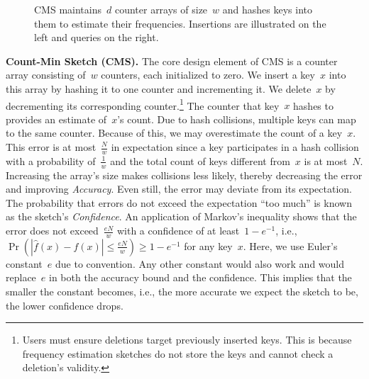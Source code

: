 \documentclass[sigconf]{acmart}
\begin{document}
\begin{figure}
\begin{tikzpicture}
    \end{tikzpicture}
    \caption{CMS maintains~$d$ counter arrays of size~$w$ and hashes keys into
    them to estimate their frequencies. Insertions are illustrated on the left
    and queries on the right.}
    \label{fig:cms_overview}
\end{figure}

\textbf{Count-Min Sketch (CMS).}
The core design element of CMS is a counter array consisting of~$w$ counters,
each initialized to zero. We insert a key~$x$ into this array by hashing it to
one counter and incrementing it. We delete~$x$ by decrementing its
corresponding counter.\footnote{Users must ensure deletions target previously
inserted keys. This is because frequency estimation sketches do not store the
keys and cannot check a deletion's validity.} The counter that key~$x$ hashes
to provides an estimate of~$x$'s count. Due to hash collisions, multiple keys
can map to the same counter. Because of this, we may overestimate the count of
a key~$x$. This error is at most~$\frac{N}{w}$ in expectation since a key
participates in a hash collision with a probability of~$\frac{1}{w}$ and the
total count of keys different from~$x$ is at most~$N$. Increasing the array's
size makes collisions less likely, thereby decreasing the error and improving
\emph{Accuracy}. Even still, the error may deviate from its expectation. The
probability that errors do not exceed the expectation ``too much'' is known as
the sketch's \emph{Confidence}. An application of Markov's inequality shows
that the error does not exceed~$\frac{eN}{w}$ with a confidence of at
least~$1-e^{-1}$, i.e., $\Pr\left( |\hat{f}(x)-f(x)| \leq \frac{eN}{w} \right)
\geq 1-e^{-1}$ for any key~$x$. Here, we use Euler's constant~$e$ due to
convention. Any other constant would also work and would replace~$e$ in both
the accuracy bound and the confidence. This implies that the smaller the
constant becomes, i.e., the more accurate we expect the sketch to be, the lower
confidence drops.
\end{document}
